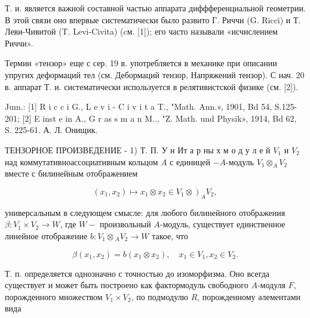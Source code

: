 \documentclass[10pt]{article}
\begin{document}
Т. и. является важной составной частью аппарата диффференциальной геометрии. В этой связи оно впервые систематически было развито Г. Риччи (G. Ricci) и Т. Леви-Чивитой (T. Levi-Civita) (cм. [1]); его часто называли «исчислением Риччи».



Термин «тензор» еще с сер. 19 в. употребляется в механике при описании упругих деформаций тел (см. Дебормаций тензор, Напряжений тензор). С нач. 20 в. аппарат Т. и. систематически используется в релятивистской физике (см. [2]).



Jum.: [1] R i c c i G., L e v i - C i v i t a T., "Math. Ann.», 1901, Bd 54, S.125-201; [2] E inst e in A., G r as s m a n M.., "Z. Math. und Physik», 1914, Bd 62, S. 225-61. А. Л. Онищик.



ТЕНЗОРНОЕ ПРОИЗВЕДЕНИЕ - 1) Т. П. У н Ит а р ны х м о д у л е й $V_{1}$ и $V_{2}$ над коммутативноассоциативным кольцом $A$ с единицей $-A$-модуль $V_{1} \otimes_{A} V_{2}$ вместе с билинейным отображением



\[

\left.\left(x_{1}, x_{2}\right) \longmapsto x_{1} \otimes x_{2} \in V_{1} \otimes\right)_{A} V_{2},

\]



универсальным в следующем смысле: для любого билинейного отображения $\beta: V_{1} \times V_{2} \rightarrow W$, где $W-$ произвольный $A$-модуль, существует единственное линейное отображение $b: V_{1} \otimes{ }_{A} V_{2} \rightarrow W$ такое, что



\[

\beta\left(x_{1}, x_{2}\right)=b\left(x_{1} \otimes x_{2}\right), \quad x_{1} \in V_{1}, x_{2} \in V_{2} .

\]



Т. п. определяется однозначно с точностью до изоморфизма. Оно всегда существует и может быть построено как фактормодуль свободного $A$-модуля $F$, порожденного множеством $V_{1} \times V_{2}$, по подмодулю $R$, порожденному әлементами вида
\end{document}
